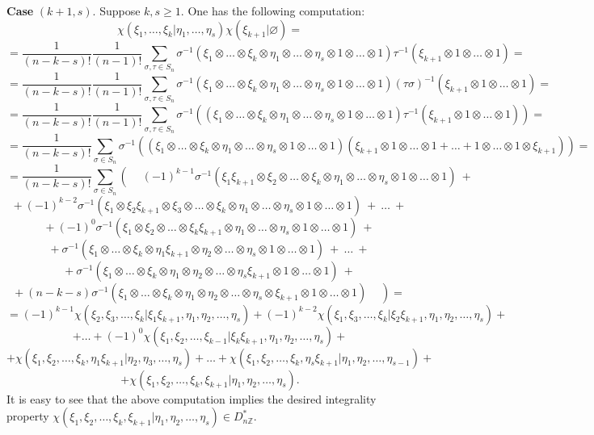 \documentclass[a4paper,14pt]{article}
\newcommand{\Z}{\mathbb{Z}}
\begin{document}
\textbf{Case} $(k+1,s)$. Suppose $k,s\ge 1$. One has the following computation:
$$
\chi(\xi_1,\ldots,\xi_k | \eta_1,\ldots,\eta_s) \chi(\xi_{k+1} | \varnothing)    = 
$$
$$
=    \frac{1}{(n-k-s)!} \frac{1}{(n-1)!} \sum_{\sigma,\tau \in S_n} \sigma^{-1}(\xi_1\otimes \ldots\otimes \xi_k\otimes \eta_1\otimes\ldots\otimes \eta_s\otimes 1\otimes \ldots\otimes 1) \tau^{-1}(\xi_{k+1}\otimes 1\otimes \ldots\otimes 1)    =
$$
$$
=   \frac{1}{(n-k-s)!} \frac{1}{(n-1)!} \sum_{\sigma,\tau \in S_n} \sigma^{-1}(\xi_1\otimes \ldots\otimes \xi_k\otimes \eta_1\otimes\ldots\otimes \eta_s\otimes 1\otimes \ldots\otimes 1)  (\tau\sigma)^{-1}  (\xi_{k+1}\otimes 1\otimes \ldots\otimes 1)   =
$$
$$
=   \frac{1}{(n-k-s)!} \frac{1}{(n-1)!} \sum_{\sigma,\tau \in S_n} \sigma^{-1}( (\xi_1\otimes \ldots\otimes \xi_k\otimes \eta_1\otimes\ldots\otimes \eta_s\otimes 1\otimes \ldots\otimes 1)  \tau^{-1} ( \xi_{k+1}\otimes 1\otimes \ldots\otimes 1) )  =
$$
$$
=   \frac{1}{(n-k-s)!}  \sum_{\sigma \in S_n} \sigma^{-1}( (\xi_1\otimes \ldots\otimes \xi_k\otimes \eta_1\otimes\ldots\otimes \eta_s\otimes 1\otimes \ldots\otimes 1)  ( \xi_{k+1}\otimes 1\otimes \ldots\otimes 1  + \ldots + 1\otimes \ldots \otimes 1\otimes \xi_{k+1}  ) )   =
$$
$$
=   \frac{1}{(n-k-s)!} \sum_{\sigma \in S_n} \left(  \phantom{1^{1^1}}  (-1)^{k-1}  \sigma^{-1}( \xi_1 \xi_{k+1}\otimes\xi_2\otimes  \ldots\otimes \xi_k\otimes \eta_1\otimes\ldots\otimes \eta_s\otimes 1\otimes \ldots\otimes 1) \ + \right.
$$
$$
+ \   (-1)^{k-2}  \sigma^{-1}( \xi_1 \otimes\xi_2\xi_{k+1}\otimes \xi_{3}\otimes  \ldots\otimes \xi_k\otimes \eta_1\otimes\ldots\otimes \eta_s\otimes 1\otimes \ldots\otimes 1) \ + \ \ldots \ +
$$
$$
+ \  (-1)^0  \sigma^{-1}( \xi_1 \otimes \xi_2\otimes  \ldots\otimes \xi_k\xi_{k+1} \otimes \eta_1\otimes\ldots\otimes \eta_s\otimes 1\otimes \ldots\otimes 1)  \  +
$$
$$
+ \  \sigma^{-1}( \xi_1\otimes  \ldots\otimes \xi_k \otimes \eta_1\xi_{k+1} \otimes \eta_2\otimes  \ldots\otimes \eta_s\otimes 1\otimes \ldots\otimes 1)  \  + \  \ldots \  + 
$$
$$
+ \  \sigma^{-1}( \xi_1\otimes  \ldots\otimes \xi_k \otimes \eta_1 \otimes \eta_2\otimes  \ldots\otimes \eta_s\xi_{k+1} \otimes 1\otimes \ldots\otimes 1)  \   +
$$
$$
\left.   + \ (n-k-s)\sigma^{-1}( \xi_1\otimes  \ldots\otimes \xi_k \otimes \eta_1 \otimes \eta_2\otimes  \ldots\otimes \eta_s\otimes \xi_{k+1} \otimes 1\otimes \ldots\otimes 1) \phantom{1^{1^1}}   \right)  =
$$
$$
=  (-1)^{k-1} \chi(\xi_2,\xi_3,\ldots,\xi_k |  \xi_1\xi_{k+1}, \eta_1, \eta_2,\ldots,\eta_s) + (-1)^{k-2} \chi(\xi_1,\xi_3,\ldots,\xi_k |  \xi_2\xi_{k+1}, \eta_1, \eta_2,\ldots,\eta_s) + 
$$
$$
+\ldots + (-1)^0 \chi(\xi_1,\xi_2,\ldots,\xi_{k-1} |  \xi_k\xi_{k+1}, \eta_1, \eta_2,\ldots,\eta_s) + 
$$
$$
+  \chi(\xi_1,\xi_2,\ldots,\xi_k, \eta_1\xi_{k+1} |  \eta_2, \eta_3,\ldots,\eta_s) + \ldots + \chi(\xi_1,\xi_2,\ldots,\xi_k, \eta_s\xi_{k+1} |  \eta_1, \eta_2,\ldots,\eta_{s-1}) + 
$$
$$
+ \chi(\xi_1,\xi_2,\ldots,\xi_k,\xi_{k+1} |  \eta_1, \eta_2,\ldots,\eta_s).
$$
It is easy to see that the above computation implies the desired integrality property $ \chi(\xi_1,\xi_2,\ldots,\xi_k,\xi_{k+1} |  \eta_1, \eta_2,\ldots,\eta_s)  \in D^*_{n\Z}$. 
\end{document}
